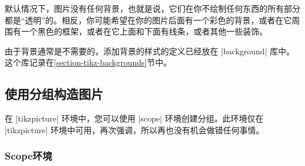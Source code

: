 默认情况下，图片没有任何背景，也就是说，它们在你不绘制任何东西的所有部分都是``透明''的。相反，你可能希望在你的图片后面有一个彩色的背景，或者在它周围有一个黑色的框架，或者在它上面和下面有线条，或者其他一些装饰。


由于背景通常是不需要的，添加背景的样式的定义已经放在 |background| 库中。这个库记录在\ref{section-tikz-backgrounds}节中。


\subsection{使用分组构造图片}


在 |{tikzpicture}| 环境中，您可以使用 |{scope}| 环境创建分组。此环境仅在 |{tikzpicture}| 环境中可用，再次强调，所以再也没有机会做错任何事情。


\subsubsection{Scope环境}


